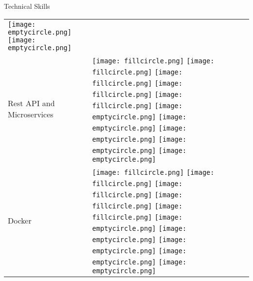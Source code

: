 \documentclass{resume}
\begin{document}
\begin{rSection}{Technical Skills}
\begin{table}[h!]
\begin{tabular}{p{10cm}p{6cm}}
  \texttt{[image: emptycircle.png]} 
  \texttt{[image: emptycircle.png]} \\
  Rest API and Microservices & 
  \texttt{[image: fillcircle.png]} 
  \texttt{[image: fillcircle.png]} 
  \texttt{[image: fillcircle.png]}
  \texttt{[image: fillcircle.png]} 
  \texttt{[image: fillcircle.png]}
  \texttt{[image: emptycircle.png]} 
  \texttt{[image: emptycircle.png]}
  \texttt{[image: emptycircle.png]} 
  \texttt{[image: emptycircle.png]} 
  \texttt{[image: emptycircle.png]} \\
  Docker & 
  \texttt{[image: fillcircle.png]} 
  \texttt{[image: fillcircle.png]} 
  \texttt{[image: fillcircle.png]}
  \texttt{[image: fillcircle.png]} 
  \texttt{[image: fillcircle.png]}
  \texttt{[image: emptycircle.png]} 
  \texttt{[image: emptycircle.png]}
  \texttt{[image: emptycircle.png]} 
  \texttt{[image: emptycircle.png]} 
  \texttt{[image: emptycircle.png]} \\
  \end{tabular}
\end{table}



\end{rSection}
\end{document}
